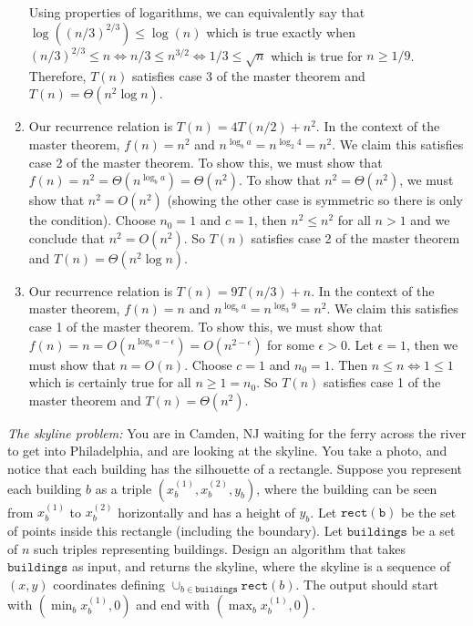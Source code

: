 \documentclass{article}
\begin{document}
\begin{enumerate}
    Using properties of logarithms, we can equivalently say that $\log ((n/3)^{2/3}) \leq \log (n)$ which is true exactly when $(n/3)^{2/3} \leq n \iff n/3 \leq n^{3/2} \iff 1/3 \leq \sqrt{n}$ which is true for $n \geq 1/9$. \parspace
    Therefore, $T(n)$ satisfies case 3 of the master theorem and $T(n) = \Theta (n^2 \log n)$.
    \item Our recurrence relation is $T(n) = 4T(n/2) + n^2$.
    In the context of the master theorem, $f(n) = n^2$ and $n^{\log_b a} = n^{\log_2 4} = n^2$.
    We claim this satisfies case 2 of the master theorem.
    To show this, we must show that $f(n) = n^2 = \Theta (n^{\log_b a}) = \Theta (n^2)$. \parspace
    To show that $n^2 = \Theta (n^2)$, we must show that $n^2 = O(n^2)$ (showing the other case is symmetric so there is only the condition).
    Choose $n_0 = 1$ and $c = 1$, then $n^2 \leq n^2$ for all $n > 1$ and we conclude that $n^2 = O(n^2)$. \parspace
    So $T(n)$ satisfies case 2 of the master theorem and $T(n) = \Theta (n^2 \log n)$.
    \item Our recurrence relation is $T(n) = 9T(n/3) + n$.
    In the context of the master theorem, $f(n) = n$ and $n^{\log_b a} = n^{\log_3 9} = n^2$.
    We claim this satisfies case 1 of the master theorem.
    To show this, we must show that $f(n) = n = O(n^{\log_b a - \epsilon}) = O(n^{2 - \epsilon})$ for some $\epsilon > 0$. \parspace
    Let $\epsilon = 1$, then we must show that $n = O(n)$.
    Choose $c = 1$ and $n_0 = 1$.
    Then $n \leq n \iff 1 \leq 1$ which is certainly true for all $n \geq 1 = n_0$.
    So $T(n)$ satisfies case 1 of the master theorem and $T(n) = \Theta (n^2)$.
\end{enumerate}


\nextprob
{}

\emph{The skyline problem:} You are in Camden, NJ waiting for the ferry across the river to
get into Philadelphia, and are looking at the skyline.  You take a photo, and notice that each building
has the silhouette of a rectangle.  Suppose you  represent each building $b$ as a
triple $(x_b^{(1)},x_b^{(2)},y_b)$, where the building can be seen from $x_b^{(1)}$ to $x_b^{(2)}$
horizontally and has a height of $y_b$.  Let $\mathtt{rect(b)}$ be the set of
points inside this rectangle (including the boundary).  Let $\mathtt{buildings}$
be a set of $n$ such triples representing buildings. Design an algorithm that takes $\mathtt{buildings}$ as input, and
returns the skyline, where the skyline is a sequence of~$(x,y)$ coordinates
defining $\cup_{b \in \mathtt{buildings}} \mathtt{rect}(b)$.  The output should
start with $(\min_b{x_b^{(1)}},0)$ and end with $(\max_b{x_b^{(1)}},0)$.
\end{document}
